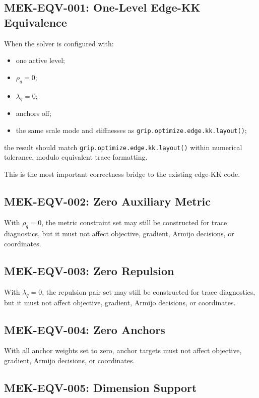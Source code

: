 \documentclass[11pt]{article}
\newcommand{\Rfunc}[1]{\texttt{#1}}
\begin{document}
\subsection{MEK-EQV-001: One-Level Edge-KK Equivalence}

When the solver is configured with:
\begin{itemize}[leftmargin=2em]
  \item one active level;
  \item \(\rho_q=0\);
  \item \(\lambda_q=0\);
  \item anchors off;
  \item the same scale mode and stiffnesses as
  \Rfunc{grip.optimize.edge.kk.layout()};
\end{itemize}
the result should match \Rfunc{grip.optimize.edge.kk.layout()} within numerical
tolerance, modulo equivalent trace formatting.

This is the most important correctness bridge to the existing edge-KK code.

\subsection{MEK-EQV-002: Zero Auxiliary Metric}

With \(\rho_q=0\), the metric constraint set may still be constructed for trace
diagnostics, but it must not affect objective, gradient, Armijo decisions, or
coordinates.

\subsection{MEK-EQV-003: Zero Repulsion}

With \(\lambda_q=0\), the repulsion pair set may still be constructed for trace
diagnostics, but it must not affect objective, gradient, Armijo decisions, or
coordinates.

\subsection{MEK-EQV-004: Zero Anchors}

With all anchor weights set to zero, anchor targets must not affect objective,
gradient, Armijo decisions, or coordinates.

\subsection{MEK-EQV-005: Dimension Support}
\end{document}
